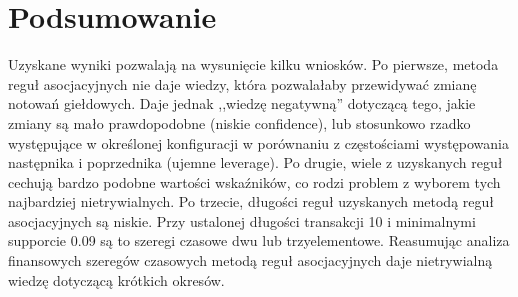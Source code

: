 \documentclass[a4paper,10pt]{article}
\begin{document}
\section{Podsumowanie}

Uzyskane wyniki pozwalają na wysunięcie kilku wniosków. Po pierwsze, metoda reguł asocjacyjnych nie daje wiedzy, która pozwalałaby przewidywać zmianę notowań
giełdowych. Daje jednak ,,wiedzę negatywną'' dotyczącą tego, jakie zmiany są mało prawdopodobne (niskie confidence), lub stosunkowo rzadko występujące w określonej konfiguracji w porównaniu z częstościami występowania następnika i poprzednika (ujemne leverage). Po drugie, wiele z uzyskanych reguł cechują bardzo podobne wartości wskaźników, co rodzi problem z wyborem tych najbardziej 
nietrywialnych. Po trzecie, długości reguł uzyskanych metodą reguł asocjacyjnych są niskie. Przy ustalonej długości transakcji 10 i minimalnymi supporcie 0.09 są to szeregi czasowe dwu lub trzyelementowe. Reasumując analiza finansowych szeregów czasowych metodą reguł asocjacyjnych daje nietrywialną wiedzę dotyczącą krótkich okresów.
\end{document}

